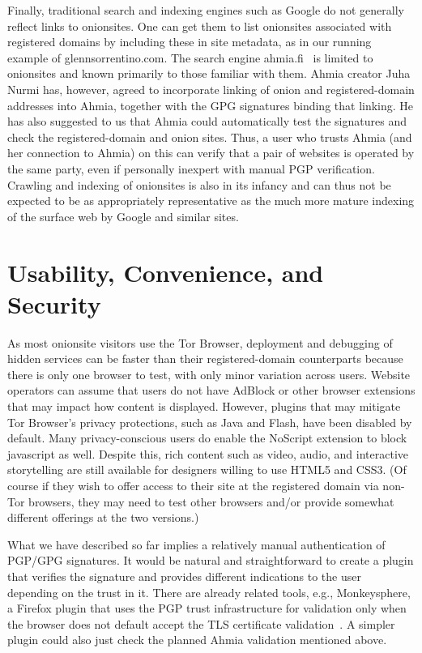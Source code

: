 \documentclass[10pt, conference, compsocconf]{styles/IEEEtran}
\begin{document}
Finally, traditional search and indexing engines such as Google do not
generally reflect links to onionsites. One can get them to list
onionsites associated with registered domains by including these in
site metadata, as in our running example of glennsorrentino.com.
The search engine
ahmia.fi~\cite{ahmia} is limited to onionsites and known primarily to
those familiar with them. Ahmia creator Juha Nurmi has, however,
agreed to incorporate linking of onion and registered-domain addresses into
Ahmia, together with the GPG signatures binding that linking.  He has
also suggested to us that Ahmia could automatically test the
signatures and check the registered-domain and onion sites. Thus, a user who
trusts Ahmia (and her connection to Ahmia) on this can verify that a
pair of websites is operated by the same party, even if personally
inexpert with manual PGP verification. Crawling and indexing of
onionsites is also in its infancy and can thus not be expected to be
as appropriately representative as the much more mature indexing of
the surface web by Google and similar sites.

\section{Usability, Convenience, and Security}

As most onionsite visitors use the Tor Browser, deployment and
debugging of hidden services can be faster than their registered-domain
counterparts because there is only one browser to test, with only
minor variation across users.  Website operators can assume that users
do not have AdBlock or other browser extensions that may impact how
content is displayed.  However, plugins that may mitigate Tor
Browser's privacy protections, such as Java and Flash, have been
disabled by default.  Many privacy-conscious users do enable the
NoScript extension to block javascript as well.  Despite this, rich
content such as video, audio, and interactive storytelling are still
available for designers willing to use HTML5 and CSS3.
(Of course if they wish to offer access to their
site at the registered domain via non-Tor browsers, they may
need to test other browsers and/or provide somewhat different
offerings at the two versions.)

What we have described so far implies a relatively manual
authentication of PGP/GPG signatures. It would be natural and
straightforward to create a plugin that verifies the signature and
provides different indications to the user depending on the trust in
it.  There are already related tools, e.g., Monkeysphere, a Firefox
plugin that uses the PGP trust infrastructure for validation only when
the browser does not default accept the TLS certificate
validation~\cite{monkeysphere}. A simpler plugin could also
just check the planned Ahmia validation mentioned above.
\end{document}
